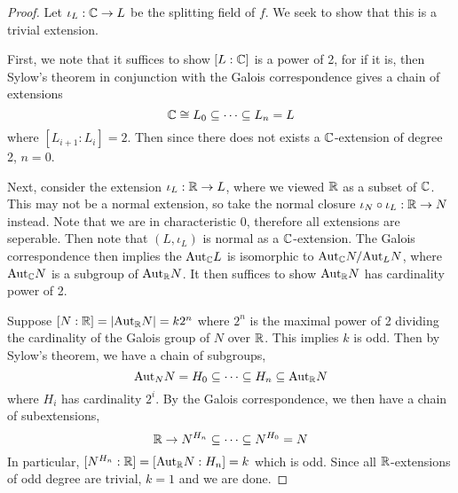 \documentclass[../book.tex]{subfiles}
\begin{document}
\begin{proof}
    
    Let $\iota_L : \mathbb{C} \to L$ be the splitting field of $f$. 
    We seek to show that this is a trivial extension.
    
    First, we note that it suffices to show $[L : \mathbb{C}]$ is a power of 2,
    for if it is, then Sylow's theorem in conjunction with the Galois correspondence
    gives a chain of extensions \[
        \mathbb{C} \cong L_0 \subseteq \cdots \subseteq L_n = L
    \]
    where $[L_{i+1} : L_i] = 2$.
    Then since there does not exists a $\mathbb{C}$-extension of degree 2, $n=0$. 
    
    Next, consider the extension $\iota_L : \mathbb{R} \to L$,
    where we viewed $\mathbb{R}$ as a subset of $\mathbb{C}$. 
    This may not be a normal extension, 
    so take the normal closure $\iota_N \circ \iota_L : \mathbb{R} \to N$ instead.
    Note that we are in characteristic $0$,
    therefore all extensions are seperable. 
    Then note that $(L,\iota_L)$ is normal as a $\mathbb{C}$-extension.
    The Galois correspondence then implies 
    the $\mathrm{Aut}_{\mathbb{C}}L$ is isomorphic to $\mathrm{Aut}_{\mathbb{C}}N / \mathrm{Aut}_{L}N$,
    where $\mathrm{Aut}_{\mathbb{C}}N$ is a subgroup of $\mathrm{Aut}_{\mathbb{R}}N$.
    It then suffices to show $\mathrm{Aut}_{\mathbb{R}}N$ has cardinality power of 2. 
    
    Suppose $[N : \mathbb{R}] = |\mathrm{Aut}_{\mathbb{R}}N| = k 2^n$ where 
    $2^n$ is the maximal power of 2 
    dividing the cardinality of the Galois group of $N$ over $\mathbb{R}$.
    This implies $k$ is odd.
    Then by Sylow's theorem, we have a chain of subgroups, \[
         \mathrm{Aut}_{N}N = H_0 \subseteq \cdots \subseteq H_n \subseteq \mathrm{Aut}_{\mathbb{R}}N
    \]
    where $H_i$ has cardinality $2^i$.
    By the Galois correspondence, we then have a chain of subextensions, \[
        \mathbb{R} \to N^{H_n} \subseteq \cdots \subseteq N^{H_0} = N
    \]
    In particular, $[N^{H_n} : \mathbb{R}] = [\mathrm{Aut}_{\mathbb{R}}N : H_n] = k$ which is odd.
    Since all $\mathbb{R}$-extensions of odd degree are trivial, 
    $k = 1$ and we are done. 
    
\end{proof}
\end{document}
